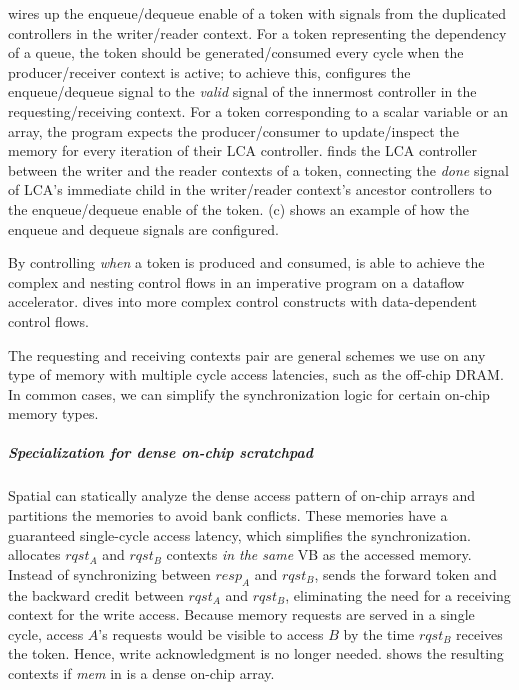 \name wires up the enqueue/dequeue enable of a token with signals from the duplicated controllers 
in the writer/reader context.
For a token representing the dependency of a queue, the token should be generated/consumed every cycle when the producer/receiver context is active; to achieve this, \name configures the enqueue/dequeue signal
to the \emph{valid} signal of the innermost controller in the requesting/receiving context.
For a token corresponding to a scalar variable or an array, the program expects the producer/consumer
to update/inspect the memory for every iteration of their LCA controller.
\name finds the LCA controller between the writer and the reader contexts of a token,
connecting the \emph{done} signal of LCA's immediate child in the writer/reader context's ancestor controllers to the enqueue/dequeue enable of the token.
 (c) shows an example of how the enqueue and dequeue signals are configured.

By controlling \emph{when} a token is produced and consumed, \name is able to achieve the complex
and nesting control flows in an imperative program on a dataflow accelerator.
 dives into more complex control constructs with 
data-dependent control flows.

The requesting and receiving contexts pair are general schemes we use on any type of memory with 
multiple cycle access latencies, such as the off-chip DRAM.
In common cases, we can simplify the synchronization logic for certain on-chip memory types.

\subparagraph{Specialization for dense on-chip scratchpad}
Spatial can statically analyze the dense access pattern of on-chip arrays and partitions the memories
to avoid bank conflicts. These memories have a guaranteed single-cycle access latency, 
which simplifies the synchronization.
\name allocates $rqst_A$ and $rqst_B$ contexts \emph{in the same} VB as the accessed memory.
Instead of synchronizing between $resp_A$ and $rqst_B$, \name sends the forward token and the
backward credit between $rqst_A$ and $rqst_B$,
eliminating the need for a receiving context for the write access.
Because memory requests are served in a single cycle, access $A$'s requests would be visible to
access $B$ by the time $rqst_B$ receives the token. Hence, write acknowledgment is no longer needed.
 shows the resulting contexts if \emph{mem} in  is a dense
on-chip array.

